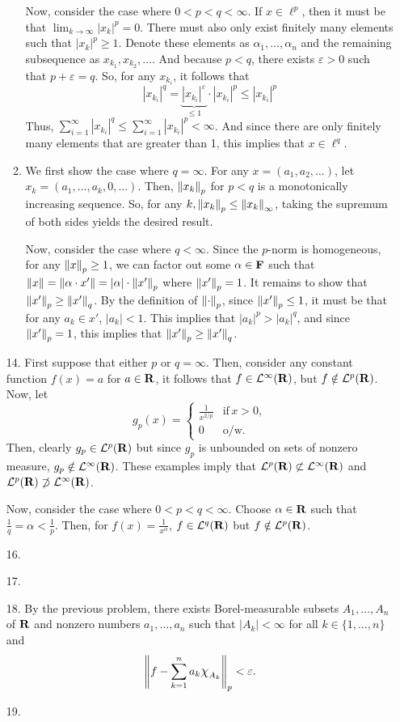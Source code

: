 \documentclass{article}
\newcommand{\eps}{\varepsilon}
\theoremstyle{remark}
\begin{document}
\begin{enumerate}[leftmargin=*]
\begin{enumerate}
    Now, consider the case where $0 < p < q < \infty$. If $x \in \ell^p$, then it must be that $\lim_{k\to\infty} |x_k|^p = 0$. There must also only exist finitely many elements such that $|x_k|^p \geq 1$. Denote these elements as $\alpha_1, \ldots, \alpha_n$ and the remaining subsequence as $x_{k_1}, x_{k_2},\ldots$. And because $p < q$, there exists $\eps > 0$ such that $p + \eps = q$. So, for any $x_{k_i}$, it follows that 
    \[
    |x_{k_i}|^q = \underbrace{|x_{k_i}|^\eps}_{\leq 1} \cdot |x_{k_i}|^p \leq |x_{k_i}|^p
    \]
    Thus, $\sum_{i=1}^\infty |x_{k_i}|^q \leq \sum_{i=1}^\infty |x_{k_i}|^p < \infty$. And since there are only finitely many elements that are greater than 1, this implies that $x \in \ell^q$.

    \item We first show the case where $q = \infty$. For any $x = (a_1, a_2,\ldots)$, let $x_k = (a_1, \ldots, a_k, 0, \ldots)$. Then,  $\left\| x_k \right\|_p$ for $p < q$ is a monotonically increasing sequence. So, for any $k, \left\| x_k \right\|_p \leq \left\| x_k \right\|_\infty$, taking the supremum of both sides yields the desired result.

    Now, consider the case where $q < \infty$. Since the $p$-norm is homogeneous, for any $\left\| x \right\|_p \geq 1$, we can factor out some $\alpha \in \mathbf{F}$ such that $\left\| x \right\| = \left\| \alpha\cdot x' \right\| = |\alpha|\cdot\left\| x' \right\|_p$ where $\left\| x' \right\|_p = 1$. It remains to show that $\left\| x' \right\|_p \geq \left\| x' \right\|_q$. By the definition of $\left\| \cdot \right\|_p$, since $\left\| x' \right\|_p \leq 1$, it must be that for any $a_k \in x'$, $|a_k| < 1$. This implies that $|a_k|^p > |a_k|^q$, and since $\left\| x' \right\|_p = 1$, this implies that $\left\| x' \right\|_p \geq \left\| x' \right\|_q$.
    \end{enumerate}
    \item[14.] First suppose that either $p$ or $q = \infty$. Then, consider any constant function $f(x) = a$ for $a \in \mathbf{R}$, it follows that $f \in \mathcal{L}^\infty(\mathbf{R})$, but $f \notin \mathcal{L}^p(\mathbf{R})$. Now, let \[
    g_p(x) = \begin{cases}
        \frac{1}{x^{2/p}} &\text{if}\,x > 0, \\
        0 &\text{o/w}.
    \end{cases}
    \]
    Then, clearly $g_p \in \mathcal{L}^p(\mathbf{R})$ but since $g_p$ is unbounded on sets of nonzero measure, $g_p \notin \mathcal{L}^\infty(\mathbf{R})$. These examples imply that $\mathcal{L}^p(\mathbf{R}) \not\subset \mathcal{L}^\infty(\mathbf{R})$ and $\mathcal{L}^p(\mathbf{R}) \not\supset \mathcal{L}^\infty(\mathbf{R})$.

    Now, consider the case where $0 < p < q < \infty$. Choose $\alpha \in \mathbf{R}$ such that $\frac{1}{q} = \alpha < \frac{1}{p}$. Then, for $f(x) = \frac{1}{x^\alpha}$, $f \in \mathcal{L}^q(\mathbf{R})$ but $f\notin \mathcal{L}^p(\mathbf{R})$. 
    \item[16.]
    \item[17.]
    \item[18.] By the previous problem, there exists Borel-measurable subsets $A_1, \ldots, A_n$ of $\mathbf{R}$ and nonzero numbers $a_1,\ldots,a_n$ such that $|A_k| < \infty$ for all $k\in \{1,\ldots,n\}$ and \[
    \norm{f - \sum_{k=1}^n a_k \bigchi_{A_k}}_p  < \eps. 
    \]
    \item[19.] 
\end{enumerate}
\end{document}
